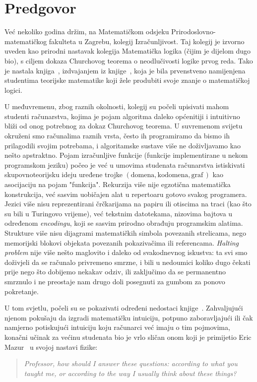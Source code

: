 \chapter{Predgovor}


Već nekoliko godina držim, na Matematičkom odsjeku Prirodoslovno-matematičkog fakulteta u Zagrebu, kolegij Izračunljivost. Taj kolegij je izvorno uveden kao prirodni nastavak kolegija Matematička logika (čijim je dijelom dugo bio), s ciljem dokaza Churchovog teorema o neodlučivosti logike prvog reda. Tako je nastala knjiga~\cite{skr:Vuk}, izdvajanjem iz knjige~\cite{skr:VukML}, koja je bila prvenstveno namijenjena studentima teorijske matematike koji žele produbiti svoje znanje o matematičkoj logici.

U međuvremenu, zbog raznih okolnosti, kolegij su počeli upisivati mahom studenti računarstva, kojima je pojam algoritma daleko općenitiji i intuitivno bliži od onog potrebnog za dokaz Churchovog teorema. U suvremenom svijetu okruženi smo računalima raznih vrsta, često ih programiramo da bismo ih prilagodili svojim potrebama, i algoritamske sustave više ne doživljavamo kao nešto apstraktno. Pojam izračunljive funkcije (funkcije implementirane u nekom programskom jeziku) počeo je već u umovima studenata računarstva istiskivati skupovnoteorijsku ideju uređene trojke $(\text{domena},\text{kodomena},\text{graf}\,)$ kao asocijaciju na pojam "funkcija". Rekurzija više nije egzotična matematička konstrukcija, već sasvim uobičajen alat u repertoaru gotovo svakog programera. Jezici više nisu reprezentirani črčkarijama na papiru ili otiscima na traci (kao što su bili u Turingovo vrijeme), već tekstnim datotekama, nizovima bajtova u određenom \emph{encodingu}, koji se sasvim prirodno obrađuju programskim alatima. Strukture više nisu dijagrami matematičkih simbola povezanih strelicama, nego memorijski blokovi objekata povezanih pokazivačima ili referencama. \emph{Halting problem} nije više nešto maglovito i daleko od svakodnevnog iskustva: ta svi smo doživjeli da se računalo privremeno smrzne, i bili u nedoumici koliko dugo čekati prije nego što dobijemo nekakav odziv, ili zaključimo da se permanentno smrznulo i ne preostaje nam drugo doli posegnuti za gumbom za ponovo pokretanje. 

U tom svjetlu, počeli su se pokazivati određeni nedostaci knjige~\cite{skr:Vuk}. Zahvaljujući njenom pokušaju da izgradi matematičku intuiciju, potpuno zaboravljajući ili čak namjerno potiskujući intuiciju koju računarci već imaju o tim pojmovima, konačni učinak za većinu studenata bio je vrlo sličan onom koji je primijetio Eric Mazur~\cite{mazur} u svojoj nastavi fizike:
\begin{quote}
    \emph{Professor, how should I answer these questions: according to what you taught me, or according to the way I usually think about these things?}
\end{quote}

